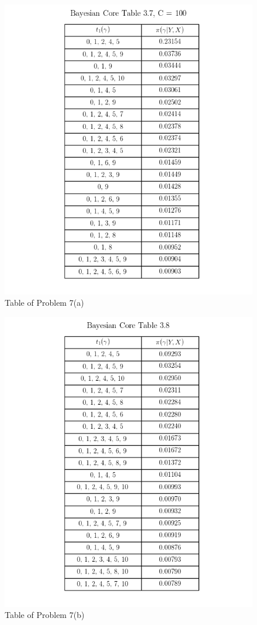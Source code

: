 \documentclass{article}
\begin{document}
\begin{figure}[ht]
\centering
\includegraphics[scale=0.6]{Table3_7.png}
\caption{Table of Problem 7(a)}
\end{figure}

\begin{figure}[ht]
\centering
\includegraphics[scale=0.6]{Table3_8.png}
\caption{Table of Problem 7(b)}
\end{figure}
\end{document}

